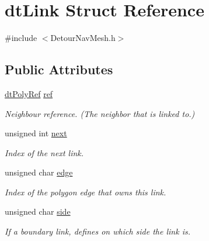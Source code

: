 \hypertarget{structdtLink}{}\section{dt\+Link Struct Reference}
\label{structdtLink}


{\ttfamily \#include $<$Detour\+Nav\+Mesh.\+h$>$}

\subsection*{Public Attributes}
\begin{DoxyCompactItemize}
\item 
\mbox{\label{structdtLink_a34c73193fed76de347adb0f2e9841659}} 
\hyperlink{group__detour_gab4e0b2257a670c1a800057999612b466}{dt\+Poly\+Ref} \hyperlink{structdtLink_a34c73193fed76de347adb0f2e9841659}{ref}
\begin{DoxyCompactList}\small\item\em Neighbour reference. (The neighbor that is linked to.) \end{DoxyCompactList}\item 
\mbox{\label{structdtLink_a475b893f03bf4c942ab6376d83dca82e}} 
unsigned int \hyperlink{structdtLink_a475b893f03bf4c942ab6376d83dca82e}{next}
\begin{DoxyCompactList}\small\item\em Index of the next link. \end{DoxyCompactList}\item 
\mbox{\label{structdtLink_a14ff7d317cbceba6ab9d1958b463cb3a}} 
unsigned char \hyperlink{structdtLink_a14ff7d317cbceba6ab9d1958b463cb3a}{edge}
\begin{DoxyCompactList}\small\item\em Index of the polygon edge that owns this link. \end{DoxyCompactList}\item 
\mbox{\label{structdtLink_a62d34d0e6350fe9790e91ec287bc1423}} 
unsigned char \hyperlink{structdtLink_a62d34d0e6350fe9790e91ec287bc1423}{side}
\begin{DoxyCompactList}\small\item\em If a boundary link, defines on which side the link is. \end{DoxyCompactList}\item 

\end{DoxyCompactItemize}
